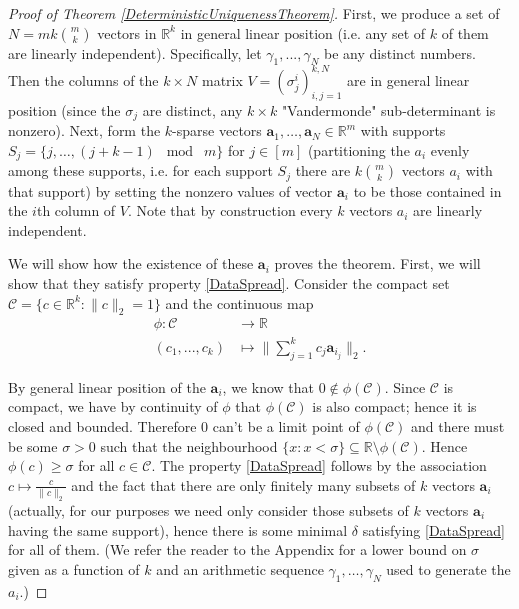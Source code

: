 \documentclass[journal, onecolumn]{IEEEtran}
\begin{document}
\begin{proof}[Proof of Theorem \ref{DeterministicUniquenessTheorem}]
First, we produce a set of $N = mk{m \choose k}$ vectors in $\mathbb{R}^k$ in general linear position (i.e. any set of $k$ of them are linearly independent). Specifically, let $\gamma_1, ..., \gamma_N$ be any distinct numbers. Then the columns of the $k \times N$ matrix $V = (\sigma^i_j)^{k,N}_{i,j=1}$ are in general linear position (since the $\sigma_j$ are distinct, any $k \times k$ "Vandermonde" sub-determinant is nonzero). Next, form the $k$-sparse vectors $\mathbf{a}_1, \ldots, \mathbf{a}_N \in \mathbb{R}^m$ with supports $S_j = \{j, \ldots, (j + k-1)\;\bmod\; m \}$ for $j \in [m]$ (partitioning the $a_i$ evenly among these supports, i.e. for each support $S_j$ there are $k{m \choose k}$ vectors $a_i$ with that support) by setting the nonzero values of vector $\mathbf{a}_i$ to be those contained in the $i$th column of $V$. Note that by construction every $k$ vectors $a_i$ are linearly independent. 

We will show how the existence of these $\mathbf{a}_i$ proves the theorem. First, we will show that they satisfy property \eqref{DataSpread}. Consider the compact set $\mathcal{C} = \{c \in \mathbb{R}^k: \|c\|_2 = 1\}$ and the continuous map
\begin{align*}
\phi: \mathcal{C} &\to \mathbb{R} \\
(c_1, ..., c_k) &\mapsto \|\sum_{j = 1}^k c_j \mathbf{a}_{i_j}\|_2.
\end{align*}

By general linear position of the $\mathbf{a}_i$, we know that $0 \notin \phi(\mathcal{C})$. Since $\mathcal{C}$ is compact, we have by continuity of $\phi$ that $\phi(\mathcal{C})$ is also compact; hence it is closed and bounded. Therefore $0$ can't be a limit point of $\phi(\mathcal{C})$ and there must be some $\sigma > 0$ such that the neighbourhood $\{x: x < \sigma\} \subseteq \mathbb{R} \setminus \phi(\mathcal{C})$. Hence $\phi(c) \geq \sigma$ for all $c \in \mathcal{C}$. The property \eqref{DataSpread} follows by the association $c \mapsto \frac{c}{\|c\|_2}$ and the fact that there are only finitely many subsets of $k$ vectors $\mathbf{a}_i$ (actually, for our purposes we need only consider those subsets of $k$ vectors $\mathbf{a}_i$ having the same support), hence there is some minimal $\delta$ satisfying \eqref{DataSpread} for all of them. (We refer the reader to the Appendix for a lower bound on $\sigma$ given as a function of $k$ and an arithmetic sequence $\gamma_1, \ldots, \gamma_N$ used to generate the $a_i$.)


\end{proof}
\end{document}
